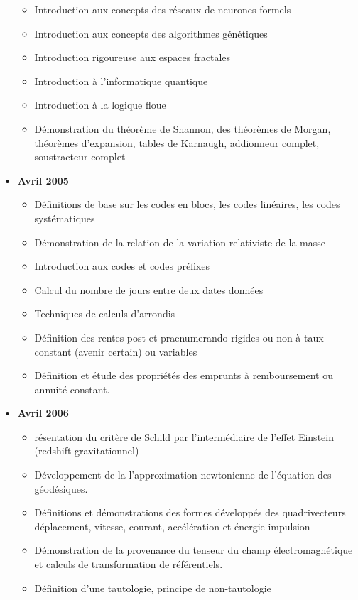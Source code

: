 \begin{itemize}
\begin{itemize}[noitemsep]
				\item Introduction aux concepts des réseaux de neurones formels
				\item Introduction aux concepts des algorithmes génétiques
				\item Introduction rigoureuse aux espaces fractales
				\item Introduction à l'informatique quantique
				\item Introduction à la logique floue
				\item Démonstration du théorème de Shannon, des théorèmes de Morgan, théorèmes d'expansion, tables de Karnaugh, addionneur complet, soustracteur complet
			\end{itemize}
		\item \textbf{Avril 2005}
			\begin{itemize}[noitemsep]
				\item Définitions de base sur les codes en blocs, les codes linéaires, les codes systématiques
				\item Démonstration de la relation de la variation relativiste de la masse
				\item Introduction aux codes et codes préfixes
				\item Calcul du nombre de jours entre deux dates données
				\item Techniques de calculs d'arrondis
				\item Définition des rentes post et praenumerando rigides ou non à taux constant (avenir certain) ou variables
				\item Définition et étude des propriétés des emprunts à remboursement ou annuité constant. 
			\end{itemize}
		\item \textbf{Avril 2006}
			\begin{itemize}[noitemsep]
				\item résentation du critère de Schild par l'intermédiaire de l'effet Einstein (redshift gravitationnel)
				\item Développement de la l'approximation newtonienne de l'équation des géodésiques.
				\item Définitions et démonstrations des formes développés des quadrivecteurs déplacement, vitesse, courant, accélération et énergie-impulsion
				\item Démonstration de la provenance du tenseur du champ électromagnétique et calculs de transformation de référentiels.
				\item Définition d'une tautologie, principe de non-tautologie

\end{itemize}
\end{itemize}
